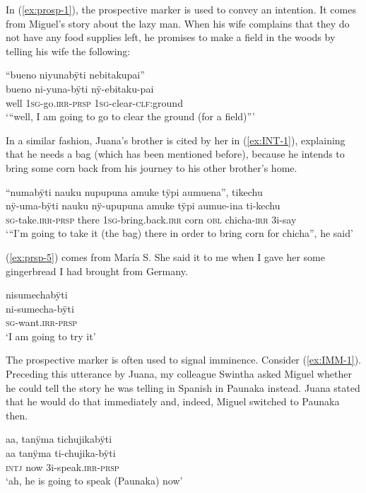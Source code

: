 In (\ref{ex:prosp-1}), the prospective marker is used to convey an intention. It comes from Miguel’s story about the lazy man. When his wife complains that they do not have any food supplies left, he promises to make a field in the woods by telling his wife the following:

\ea\label{ex:prosp-1}
\begingl
\glpreamble “bueno niyunabÿti nebitakupai”\\
\gla bueno ni-yuna-bÿti nÿ-ebitaku-pai\\
\glb well 1\textsc{sg}-go.\textsc{irr}-\textsc{prsp} 1\textsc{sg}-clear-\textsc{clf:}ground\\
\glft ‘“well, I am going to go to clear the ground (for a field)”’
\endgl
\trailingcitation{[mox-n110920l.020]}
\xe

In a similar fashion, Juana’s brother is cited by her in (\ref{ex:INT-1}), explaining that he needs a bag (which has been mentioned before), because he intends to bring some corn back from his journey to his other brother’s home.

\ea\label{ex:INT-1}
\begingl 
\glpreamble “numabÿti nauku nupupuna amuke tÿpi aumuena”, tikechu\\
\gla nÿ-uma-bÿti nauku nÿ-upupuna amuke tÿpi aumue-ina ti-kechu\\ 
\textsc{sg}-take.\textsc{irr}-\textsc{prsp} there 1\textsc{sg}-bring.back.\textsc{irr} corn \textsc{obl} chicha-\textsc{irr} 3i-say\\ 
\glft ‘“I’m going to take it (the bag) there in order to bring corn for chicha”, he said’
\trailingcitation{[jxx-p120430l-2.396]}
\xe

(\ref{ex:prsp-5}) comes from María S. She said it to me when I gave her some gingerbread I had brought from Germany.

\ea\label{ex:prsp-5}
\begingl
\glpreamble nisumechabÿti\\
\gla ni-sumecha-bÿti\\
\textsc{sg}-want.\textsc{irr}-\textsc{prsp}\\
\glft ‘I am going to try it’
\endgl
{}
\xe

The prospective marker is often used to signal imminence. Consider (\ref{ex:IMM-1}). Preceding this utterance by Juana, my colleague Swintha asked Miguel whether he could tell the story he was telling in Spanish in Paunaka instead. Juana stated that he would do that immediately and, indeed, Miguel switched to Paunaka then.

\ea\label{ex:IMM-1}
\begingl 
\glpreamble aa, tanÿma tichujikabÿti\\
\gla  aa tanÿma ti-chujika-bÿti\\ 
\glb \textsc{intj} now 3i-speak.\textsc{irr}-\textsc{prsp}\\ 
\glft ‘ah, he is going to speak (Paunaka) now’
\trailingcitation{[jmx-n120429ls-x5.150]}
\xe

